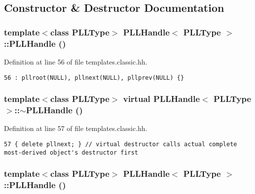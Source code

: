 \subsection{Constructor \& Destructor Documentation}
\subsubsection{\setlength{\rightskip}{0pt plus 5cm}template$<$class PLLType$>$ PLLHandle$<$ {\bf PLLType} $>$::PLLHandle ()\hspace{0.3cm}{\tt  [inline, protected]}}\label{classPLLHandle_b0}




Definition at line 56 of file templates.classic.hh.



\footnotesize\begin{verbatim}56 : pllroot(NULL), pllnext(NULL), pllprev(NULL) {} 
\end{verbatim}\normalsize 
{}
\subsubsection{\setlength{\rightskip}{0pt plus 5cm}template$<$class PLLType$>$ virtual PLLHandle$<$ {\bf PLLType} $>$::$\sim$PLLHandle ()\hspace{0.3cm}{\tt  [inline, protected, virtual]}}\label{classPLLHandle_b1}




Definition at line 57 of file templates.classic.hh.



\footnotesize\begin{verbatim}57 { delete pllnext; } // virtual destructor calls actual complete most-derived object's destructor first
\end{verbatim}\normalsize 
{}
\subsubsection{\setlength{\rightskip}{0pt plus 5cm}template$<$class PLLType$>$ PLLHandle$<$ {\bf PLLType} $>$::PLLHandle ()\hspace{0.3cm}{\tt  [inline, protected]}}\label{classPLLHandle_b2}




